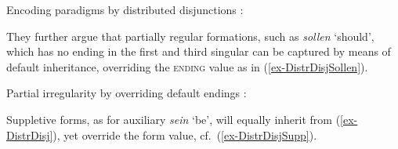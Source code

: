 \documentclass[output=paper
	        ,collection
	        ,collectionchapter
 	        ,biblatex
                ,babelshorthands
                ,newtxmath
                ,draftmode
                ,colorlinks, citecolor=brown
]{langscibook}
\newcommand{\mathplus}{{\normalfont +}}
\begin{document}


  
\ea
\label{ex-DistrDisj}
Encoding paradigms by distributed disjunctions \citep[105]{Krieger:Nerbonne:93}:\\
\z  


They further argue that partially regular formations, such as
\textit{sollen} `should', which has no ending in the first and third
singular can be captured by means of default inheritance, overriding
the \textsc{ending} value as in (\ref{ex-DistrDisjSollen}).  

\ea
\label{ex-DistrDisjSollen}

Partial irregularity by overriding default endings \citep[105]{Krieger:Nerbonne:93}:\\
\z

Suppletive forms, as for auxiliary \textit{sein} `be', will equally
inherit from (\ref{ex-DistrDisj}), yet override the form value,
cf.\ (\ref{ex-DistrDisjSupp}).  
\end{document}
